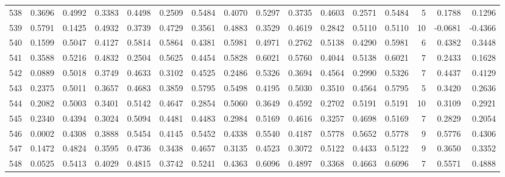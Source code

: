 \begin{tabular}{lrrrrrrrrrrrrrrr}
538 &      0.3696 &  0.4992 &  0.3383 &  0.4498 &  0.2509 &  0.5484 &  0.4070 &  0.5297 &  0.3735 &  0.4603 &   0.2571 &     0.5484 &      5 &                    0.1788 &                     0.1296 \\
539 &      0.5791 &  0.1425 &  0.4932 &  0.3739 &  0.4729 &  0.3561 &  0.4883 &  0.3529 &  0.4619 &  0.2842 &   0.5110 &     0.5110 &     10 &                   -0.0681 &                    -0.4366 \\
540 &      0.1599 &  0.5047 &  0.4127 &  0.5814 &  0.5864 &  0.4381 &  0.5981 &  0.4971 &  0.2762 &  0.5138 &   0.4290 &     0.5981 &      6 &                    0.4382 &                     0.3448 \\
541 &      0.3588 &  0.5216 &  0.4832 &  0.2504 &  0.5625 &  0.4454 &  0.5828 &  0.6021 &  0.5760 &  0.4044 &   0.5138 &     0.6021 &      7 &                    0.2433 &                     0.1628 \\
542 &      0.0889 &  0.5018 &  0.3749 &  0.4633 &  0.3102 &  0.4525 &  0.2486 &  0.5326 &  0.3694 &  0.4564 &   0.2990 &     0.5326 &      7 &                    0.4437 &                     0.4129 \\
543 &      0.2375 &  0.5011 &  0.3657 &  0.4683 &  0.3859 &  0.5795 &  0.5498 &  0.4195 &  0.5030 &  0.3510 &   0.4564 &     0.5795 &      5 &                    0.3420 &                     0.2636 \\
544 &      0.2082 &  0.5003 &  0.3401 &  0.5142 &  0.4647 &  0.2854 &  0.5060 &  0.3649 &  0.4592 &  0.2702 &   0.5191 &     0.5191 &     10 &                    0.3109 &                     0.2921 \\
545 &      0.2340 &  0.4394 &  0.3024 &  0.5094 &  0.4481 &  0.4483 &  0.2984 &  0.5169 &  0.4616 &  0.3257 &   0.4698 &     0.5169 &      7 &                    0.2829 &                     0.2054 \\
546 &      0.0002 &  0.4308 &  0.3888 &  0.5454 &  0.4145 &  0.5452 &  0.4338 &  0.5540 &  0.4187 &  0.5778 &   0.5652 &     0.5778 &      9 &                    0.5776 &                     0.4306 \\
547 &      0.1472 &  0.4824 &  0.3595 &  0.4736 &  0.3438 &  0.4657 &  0.3135 &  0.4523 &  0.3072 &  0.5122 &   0.4433 &     0.5122 &      9 &                    0.3650 &                     0.3352 \\
548 &      0.0525 &  0.5413 &  0.4029 &  0.4815 &  0.3742 &  0.5241 &  0.4363 &  0.6096 &  0.4897 &  0.3368 &   0.4663 &     0.6096 &      7 &                    0.5571 &                     0.4888 \\

\end{tabular}

